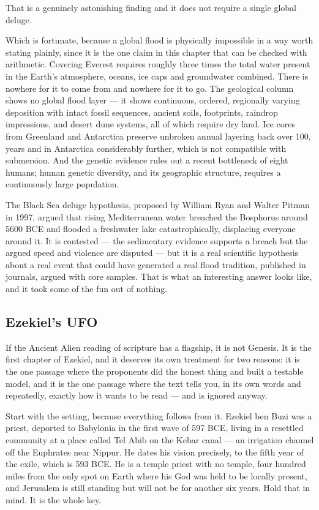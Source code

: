 That is a genuinely astonishing finding and it does not require a single global deluge.

Which is fortunate, because a global flood is physically impossible in a way worth stating
plainly, since it is the one claim in this chapter that can be checked with arithmetic. Covering
Everest requires roughly three times the total water present in the Earth's atmosphere, oceans,
ice caps and groundwater combined. There is nowhere for it to come from and nowhere for it to
go. The geological column shows no global flood layer --- it shows continuous, ordered,
regionally varying deposition with intact fossil sequences, ancient soils, footprints, raindrop
impressions, and desert dune systems, all of which require dry land. Ice cores from Greenland
and Antarctica preserve unbroken annual layering back over 100, years and in Antarctica
considerably further, which is not compatible with submersion. And the genetic evidence rules
out a recent bottleneck of eight humans; human genetic diversity, and its geographic structure,
requires a continuously large population.

\begin{funfact}
The Black Sea deluge hypothesis, proposed by William Ryan and Walter Pitman in 1997, argued that
rising Mediterranean water breached the Bosphorus around 5600 BCE and flooded a freshwater lake
catastrophically, displacing everyone around it. It is contested --- the sedimentary evidence
supports a breach but the argued speed and violence are disputed --- but it is a real scientific
hypothesis about a real event that could have generated a real flood tradition, published in
journals, argued with core samples. That is what an interesting answer looks like, and it took
some of the fun out of nothing.
\end{funfact}

\subsection{Ezekiel's UFO}\label{sec:ezekiel}

If the Ancient Alien reading of scripture has a flagship, it is not Genesis. It is the first
chapter of Ezekiel, and it deserves its own treatment for two reasons: it is the one passage where
the proponents did the honest thing and built a testable model, and it is the one passage where the
text tells you, in its own words and repeatedly, exactly how it wants to be read --- and is
ignored anyway.

Start with the setting, because everything follows from it. Ezekiel ben Buzi was a priest, deported
to Babylonia in the first wave of 597 BCE, living in a resettled community at a place called Tel
Abib on the Kebar canal --- an irrigation channel off the Euphrates near Nippur. He dates his
vision precisely, to the fifth year of the exile, which is 593 BCE. He is a temple priest with no
temple, four hundred miles from the only spot on Earth where his God was held to be locally
present, and Jerusalem is still standing but will not be for another six years. Hold that in mind.
It is the whole key.

